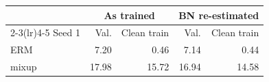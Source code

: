 \begin{tabular}{@{}lrrrr@{}}
\toprule
& \multicolumn{2}{c}{As trained} & \multicolumn{2}{c}{BN re-estimated}\\
\cmidrule(lr){2-3}\cmidrule(lr){4-5}
Seed 1 & Val. & Clean train & Val. & Clean train\\
\midrule
ERM & 7.20 & 0.46 & 7.14 & 0.44\\
mixup & 17.98 & 15.72 & 16.94 & 14.58\\
\bottomrule
\end{tabular}
